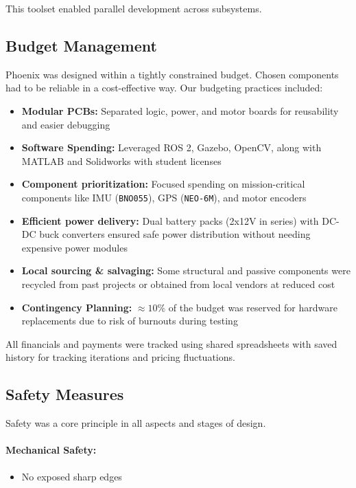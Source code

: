 \documentclass[12pt,a4paper,twocolumn]{article}
\begin{document}
This toolset enabled parallel development across subsystems.

\subsection{Budget Management}
Phoenix was designed within a tightly constrained budget. Chosen components had to be reliable in a cost-effective way. Our budgeting practices included:

\begin{itemize}
    \item \textbf{Modular PCBs:} Separated logic, power, and motor
    boards for reusability and easier debugging
    \item \textbf{Software Spending:} Leveraged ROS 2, Gazebo, OpenCV, along with MATLAB and Solidworks with student licenses
    \item \textbf{Component prioritization:} Focused spending on mission-critical components like IMU (\texttt{BNO055}), GPS (\texttt{NEO-6M}), and motor encoders
    \item \textbf{Efficient power delivery:} Dual battery packs (2x12V in series) with DC-DC buck converters ensured safe power distribution without needing expensive power modules
    \item \textbf{Local sourcing \& salvaging:} Some structural and passive components were recycled from past projects or obtained from local vendors at reduced cost
    \item \textbf{Contingency Planning:} $\approx 10\%$ of the budget was reserved for hardware replacements due to risk of burnouts during testing
\end{itemize}

All financials and payments were tracked using shared spreadsheets with saved history for tracking iterations and pricing fluctuations.

\subsection{Safety Measures}

Safety was a core principle in all aspects and stages of design.

\paragraph{Mechanical Safety:}

\begin{itemize}
    \item No exposed sharp edges
\end{itemize}
\end{document}
